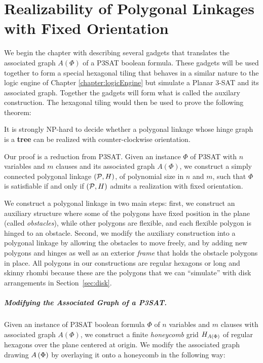\chapter{Realizability of Polygonal Linkages with Fixed Orientation\label{chapter:polygonalLinkage}}

We begin the chapter with describing several gadgets that translates the associated graph $A(\Phi)$ of a P3SAT boolean formula.  
These gadgets will be used together to form a special hexagonal tiling that behaves in a similar nature to the logic engine of Chapter \ref{chapter:logicEngine} but simulate a Planar 3-SAT and its associated graph.
Together the gadgets will form what is called the auxilary construction.
The hexagonal tiling would then be used to prove the following theorem:
\begin{thm}\label{thm:hinge2}
It is strongly NP-hard to decide whether a polygonal linkage whose hinge graph is a \textbf{tree} can be realized with counter-clockwise orientation.
\end{thm}
Our proof is a reduction from P3SAT.
Given an instance $\Phi$ of P3SAT with $n$ variables and $m$ clauses and its associated graph $A(\Phi)$, we construct a simply connected polygonal linkage $({\cal P},H)$, of polynomial size in $n$ and $m$, such that $\Phi$ is satisfiable if and only if $({\cal P},H)$ admits a realization with fixed orientation. 

We construct a polygonal linkage  in two main steps: first, we construct an auxiliary structure where some of the polygons have fixed position in the plane (called \emph{obstacles}), while other polygons are flexible, and each flexible polygon is hinged to an obstacle. 
Second, we modify the auxiliary construction into a polygonal linkage by allowing the obstacles to move freely, and by adding new polygons and hinges as well as an exterior \emph{frame} that holds the obstacle polygons in place.
All polygons in our constructions are regular hexagons or long and skinny rhombi because these are the polygons that we can ``simulate'' with disk arrangements in Section~\ref{sec:disk}.
\paragraph{Modifying the Associated Graph of a P3SAT.}

Given an instance of P3SAT boolean formula $\Phi$ of $n$ variables and $m$ clauses with associated graph $A(\Phi)$, we construct a finite \textit{honeycomb} grid $H_{A \left( \Phi \right)}$ of regular hexagons over the plane centered at origin.
We modify the associated graph drawing $A\left( \Phi \right)$ by overlaying it onto a honeycomb in the following way:

